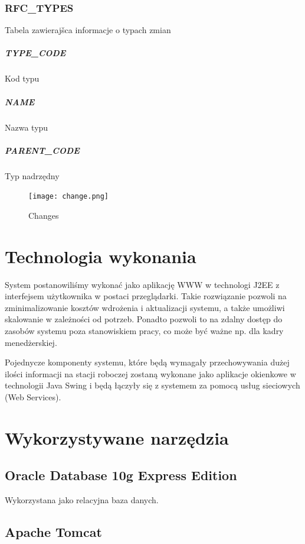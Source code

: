 \documentclass[a4paper, oneside, 11pt]{report}
\begin{document}
\subsection{RFC\_TYPES}  Tabela zawierajšca informacje o typach zmian
\paragraph{TYPE\_CODE} Kod typu
\paragraph{NAME} Nazwa typu
\paragraph{PARENT\_CODE} Typ nadrzędny


\begin{figure}[!ht]
\centering
\texttt{[image: change.png]}
\caption{Changes}
\end{figure}

\chapter{Technologia wykonania}

System postanowiliśmy wykonać jako aplikację WWW w technologi J2EE z interfejsem użytkownika w postaci przeglądarki. 
Takie rozwiązanie pozwoli na zminimalizowanie kosztów wdrożenia i aktualizacji systemu, a także umożliwi skalowanie 
w zależności od potrzeb. Ponadto pozwoli to na zdalny dostęp do zasobów systemu poza stanowiskiem pracy, co może być 
ważne np. dla kadry menedżerskiej.

Pojednycze komponenty systemu, które będą wymagały przechowywania dużej ilości informacji na stacji roboczej zostaną 
wykonane jako aplikacje okienkowe w technologii Java Swing i będą łączyły się z systemem za pomocą usług sieciowych (Web Services).

\chapter{Wykorzystywane narzędzia}

\section{Oracle Database 10g Express Edition}

Wykorzystana jako relacyjna baza danych.

\section{Apache Tomcat}
\end{document}
